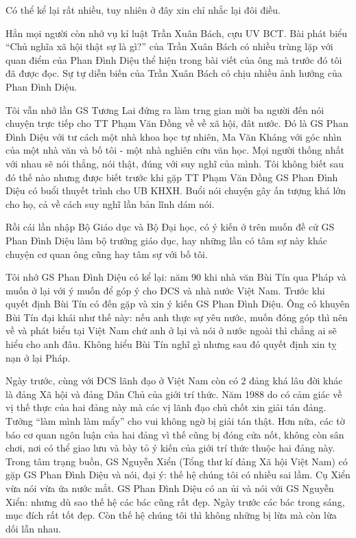  

Có thể kể lại rất nhiều, tuy nhiên ở đây xin chỉ nhắc lại đôi điều.

 

Hẳn mọi người còn nhớ vụ kỉ luật Trần Xuân Bách, cựu UV BCT. Bài phát biểu “Chủ nghĩa xã hội thật sự là gì?” của Trần Xuân Bách có nhiều trùng lặp với quan điểm của Phan Đình Diệu thể hiện trong bài viết của ông mà trước đó tôi đã được đọc. Sự tự diễn biến của Trần Xuân Bách có chịu nhiều ảnh hưởng của Phan Đình Diệu.

 

Tôi vẫn nhớ lần GS Tương Lai đứng ra làm trng gian mời ba người đến nói chuyện trực tiếp cho TT Phạm Văn Đồng về về xã hội, đât nước. Đó là GS Phan Đình Diệu với tư cách một nhà khoa học tự nhiên, Ma Văn Kháng với góc nhìn của một nhà văn và bố tôi - một nhà nghiên cứu văn học. Mọi người thống nhất với nhau sẽ nói thẳng, nói thật, đúng với suy nghĩ của mình. Tôi không biết sau đó thế nào nhưng được biết trước khi gặp TT Phạm Văn Đồng GS Phan Đình Diệu có buổi thuyết trình cho UB KHXH. Buổi nói chuyện gây ấn tượng khá lớn cho họ, cả về cách suy nghĩ lần bản lĩnh dám nói.  

 

Rồi cái lần nhập Bộ Giáo dục và Bộ Đại học, có ý kiến ở trên muốn đề cử GS Phan Đình Diệu làm bộ trưởng giáo dục, hay những lần có tâm sự này khác chuyện cơ quan ông cũng hay tâm sự với bố tôi.

 

Tôi nhớ GS Phan Đình Diệu có kể lại: năm 90 khi nhà văn Bùi Tín qua Pháp và muốn ở lại với ý muốn để góp ý cho ĐCS và nhà nước Việt Nam. Trước khi quyết định Bùi Tín có đến gặp và xin ý kiến GS Phan Đình Diệu. Ông có khuyên Bùi Tín đại khái như thế này: nếu anh thực sự yêu nước, muốn đóng góp thì nên về và phát biểu tại Việt Nam chứ anh ở lại và nói ở nước ngoài thì chẳng ai sẽ hiểu cho anh đâu. Không hiểu Bùi Tín nghĩ gì nhưng sau đó quyết định xin tỵ nạn ở lại Pháp.

 

Ngày trước, cùng với ĐCS lãnh đạo ở Việt Nam còn có 2 đảng khá lâu đời khác là đảng Xã hội và đảng Dân Chủ của giới trí thức. Năm 1988 do có cảm giác về vị thế thực của hai đảng này mà các vị lãnh đạo chủ chốt xin giải tán đảng. Tưởng “làm mình làm mẩy” cho vui không ngờ bị giải tán thật. Hơn nữa, các tờ báo cơ quan ngôn luận của hai đảng vì thế cũng bị đóng cửa nốt, không còn sân chơi, nơi có thể giao lưu và bày tỏ ý kiến của giới trí thức thuộc hai đảng này. Trong tâm trạng buồn, GS Nguyễn Xiển (Tổng thư kí đảng Xã hội Việt Nam) có gặp GS Phan Đình Diệu và nói, đại ý: thế hệ chúng tôi có nhiều sai lầm. Cụ Xiển vừa nói vừa ứa nước mắt. GS Phan Đình Diệu có an ủi và nói với GS Nguyễn Xiển: nhưng dù sao thế hệ các bác cũng rất đẹp. Ngày trước các bác trong sáng, mục đích rất tốt đẹp. Còn thế hệ chúng tôi thì không những bị lừa mà còn lừa dối lẫn nhau.

